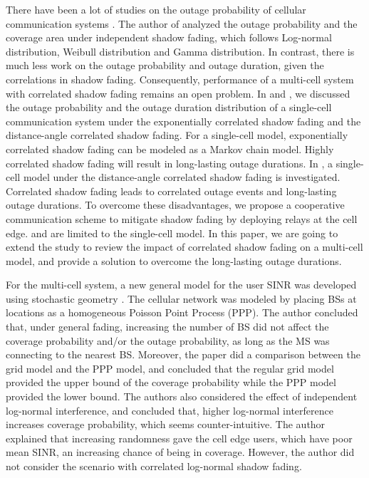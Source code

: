 \documentclass[journal,10pt]{IEEEtran}
\begin{document}
\par There have been a lot of studies on the outage probability of cellular communication systems \cite{abu1991outage, petrovic2013outage, emamian2014outage}. The author of \cite{vural2015effect} analyzed the outage probability and the coverage area under independent shadow fading, which follows Log-normal distribution, Weibull distribution and Gamma distribution. In contrast, there is much less work on the outage probability and outage duration, given the correlations in shadow fading. Consequently, performance of a multi-cell system with correlated shadow fading remains an open problem. In \cite{lu2015long} and \cite{lu2015shining}, we discussed the outage probability and the outage duration distribution of a single-cell communication system under the exponentially correlated shadow fading and the distance-angle correlated shadow fading. For a single-cell model, exponentially correlated shadow fading can be modeled as a Markov chain model. Highly correlated shadow fading will result in long-lasting outage durations. In \cite{lu2015shining}, a single-cell model under the distance-angle correlated shadow fading is investigated. Correlated shadow fading leads to correlated outage events and long-lasting outage durations. To overcome these disadvantages, we propose a cooperative communication scheme to mitigate shadow fading by deploying relays at the cell edge. \cite{lu2015long} and \cite{lu2015shining} are limited to the single-cell model. In this paper, we are going to extend the study to review the impact of correlated shadow fading on a multi-cell model, and provide a solution to overcome the long-lasting outage durations.
\par For the multi-cell system, a new general model for the user SINR was developed using stochastic geometry \cite{andrews2011tractable}. The cellular network was modeled by placing BSs at locations as a homogeneous Poisson Point Process (PPP). The author concluded that, under general fading, increasing the number of BS did not affect the coverage probability and/or the outage probability, as long as the MS was connecting to the nearest BS. Moreover, the paper did a comparison between the grid model and the PPP model, and concluded that the regular grid model provided the upper bound of the coverage probability while the PPP model provided the lower bound. The authors also considered the effect of independent log-normal interference, and concluded that, higher log-normal interference increases coverage probability, which seems counter-intuitive. The author explained that increasing randomness gave the cell edge users, which have poor mean SINR, an increasing chance of being in coverage. However, the author did not consider the scenario with correlated log-normal shadow fading. 
\end{document}
